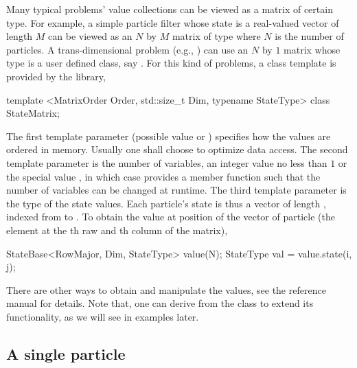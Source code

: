 Many typical problems' value collections can be viewed as a matrix of certain
type. For example, a simple particle filter whose state is a real-valued
vector of length $M$ can be viewed as an $N$ by $M$ matrix of type
 where $N$ is the number of particles. A trans-dimensional
problem (e.g., \cite{Jasra:2008bb}) can use an $N$ by $1$ matrix whose type is
a user defined class, say . For this kind of problems,
a class template is provided by the library,
\begin{cppcode}
template <MatrixOrder Order, std::size_t Dim, typename StateType>
class StateMatrix;
\end{cppcode}
The first template parameter (possible value  or
) specifies how the values are ordered in memory. Usually
one shall choose  to optimize data access. The second
template parameter is the number of variables, an integer value no less than
$1$ or the special value , in which case
 provides a member function  such
that the number of variables can be changed at runtime. The third template
parameter is the type of the state values. Each particle's state is thus a
vector of length , indexed from  to
. To obtain the value at position  of the
vector of particle  (the element at the th raw and
th column of the matrix),
\begin{cppcode}
StateBase<RowMajor, Dim, StateType> value(N);
StateType val = value.state(i, j);
\end{cppcode}
There are other ways to obtain and manipulate the values, see the reference
manual for details. Note that, one can derive from the 
class to extend its functionality, as we will see in examples later.

\subsection{A single particle}
\label{sub:A single particle}

